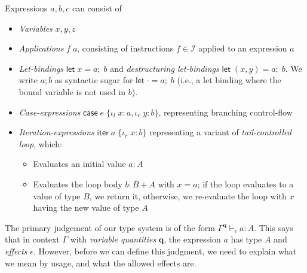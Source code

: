 \documentclass[acmsmall,screen,review]{acmart}
\newcommand{\mc}[1]{\ensuremath{\mathcal{#1}}}
\newcommand{\mb}[1]{\ensuremath{\mathbf{#1}}}
\newcommand{\ms}[1]{\ensuremath{\mathsf{#1}}}
\newcommand{\lto}{:}
\newcommand{\linl}[1]{\iota_l\;{#1}}
\newcommand{\linr}[1]{\iota_r\;{#1}}
\newcommand{\letexpr}[3]{\ensuremath{\ms{let}\;#1 = #2;\;#3}}
\newcommand{\caseexpr}[5]{\ms{case}\;#1\;\{\linl{#2} \lto #3, \linr{#4} \lto #5\}}
\newcommand{\liter}[3]{\ms{iter}\;#1\;\{ \linr{#2} \lto #3 \}}
\newcommand{\hasty}[4]{#1 \vdash_{#2} #3: {#4}}
\begin{document}
Expressions $a, b, c$ can consist of
\begin{itemize}
  \item \emph{Variables} $x, y, z$
  \item \emph{Applications} $f\;a$, consisting of instructions $f \in \mc{I}$ applied to an
  expression $a$
  \item \emph{Let-bindings} $\letexpr{x}{a}{b}$ and \emph{destructuring let-bindings} $\letexpr{(x,
  y)}{a}{b}$. We write $a; b$ as syntactic sugar for $\letexpr{\cdot}{a}{b}$ (i.e., a let binding
  where the bound variable is not used in $b$).
  \item \emph{Case-expressions} $\caseexpr{e}{x}{a}{y}{b}$, representing branching control-flow
  \item \emph{Iteration-expressions} $\liter{a}{x}{b}$ representing a variant of
  \emph{tail-controlled loop}, which:
  \begin{itemize}
    \item Evaluates an initial value $a : A$
    \item Evaluates the loop body $b : B + A$ with $x = a$; if the loop evaluates to a value of type
    $B$, we return it, otherwise, we re-evaluate the loop with $x$ having the new value of type $A$
  \end{itemize}
\end{itemize}

The primary judgement of our type system is of the form $\hasty{\Gamma^{\mb{q}}}{\epsilon}{a}{A}$.
This says that in context $\Gamma$ with \emph{variable quantities} $\mb{q}$, the expression $a$ has
type $A$ and \emph{effects} $\epsilon$. However, before we can define this judgment, we need to
explain what we mean by usage, and what the allowed effects are. 
\end{document}
